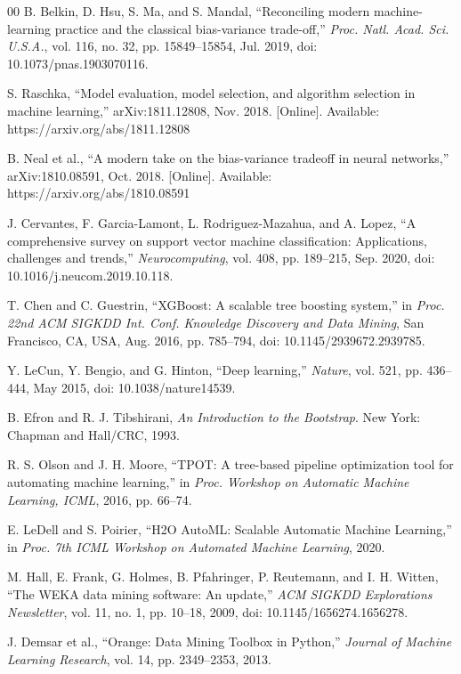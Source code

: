 \documentclass[conference]{IEEEtran}
\begin{document}
\begin{thebibliography}{00}
 B. Belkin, D. Hsu, S. Ma, and S. Mandal, ``Reconciling modern machine-learning practice and the classical bias-variance trade-off,'' \textit{Proc. Natl. Acad. Sci. U.S.A.}, vol. 116, no. 32, pp. 15849--15854, Jul. 2019, doi: 10.1073/pnas.1903070116.

 S. Raschka, ``Model evaluation, model selection, and algorithm selection in machine learning,'' arXiv:1811.12808, Nov. 2018. [Online]. Available: https://arxiv.org/abs/1811.12808

 B. Neal et al., ``A modern take on the bias-variance tradeoff in neural networks,'' arXiv:1810.08591, Oct. 2018. [Online]. Available: https://arxiv.org/abs/1810.08591

 J. Cervantes, F. Garcia-Lamont, L. Rodriguez-Mazahua, and A. Lopez, ``A comprehensive survey on support vector machine classification: Applications, challenges and trends,'' \textit{Neurocomputing}, vol. 408, pp. 189--215, Sep. 2020, doi: 10.1016/j.neucom.2019.10.118.

 T. Chen and C. Guestrin, ``XGBoost: A scalable tree boosting system,'' in \textit{Proc. 22nd ACM SIGKDD Int. Conf. Knowledge Discovery and Data Mining}, San Francisco, CA, USA, Aug. 2016, pp. 785--794, doi: 10.1145/2939672.2939785.

 Y. LeCun, Y. Bengio, and G. Hinton, ``Deep learning,'' \textit{Nature}, vol. 521, pp. 436--444, May 2015, doi: 10.1038/nature14539.

 B. Efron and R. J. Tibshirani, \textit{An Introduction to the Bootstrap}. New York: Chapman and Hall/CRC, 1993.

 R. S. Olson and J. H. Moore, ``TPOT: A tree-based pipeline optimization tool for automating machine learning,'' in \textit{Proc. Workshop on Automatic Machine Learning, ICML}, 2016, pp. 66--74.

 E. LeDell and S. Poirier, ``H2O AutoML: Scalable Automatic Machine Learning,'' in \textit{Proc. 7th ICML Workshop on Automated Machine Learning}, 2020.

 M. Hall, E. Frank, G. Holmes, B. Pfahringer, P. Reutemann, and I. H. Witten, ``The WEKA data mining software: An update,'' \textit{ACM SIGKDD Explorations Newsletter}, vol. 11, no. 1, pp. 10--18, 2009, doi: 10.1145/1656274.1656278.

 J. Demsar et al., ``Orange: Data Mining Toolbox in Python,'' \textit{Journal of Machine Learning Research}, vol. 14, pp. 2349--2353, 2013.


\end{thebibliography}
\end{document}
